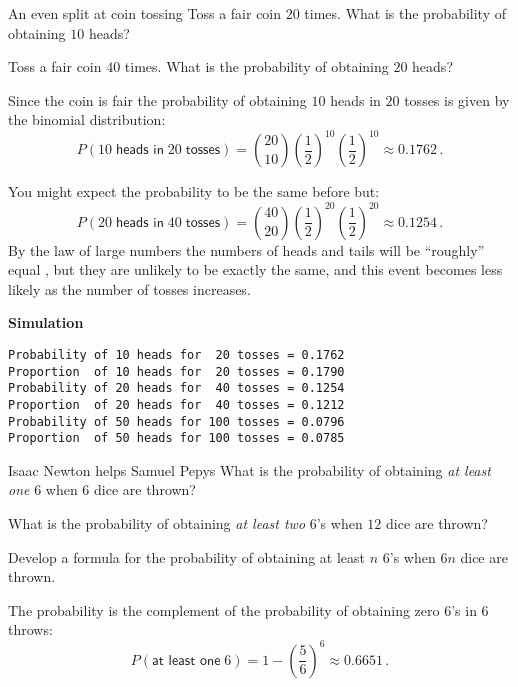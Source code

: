 
\begin{prob}{An even split at coin tossing}
 Toss a fair coin $20$ times. What is the probability of obtaining $10$ heads?

 Toss a fair coin $40$ times. What is the probability of obtaining $20$ heads?
\end{prob}

\solution{}

 Since the coin is fair the probability of obtaining $10$ heads in $20$ tosses is given by the binomial distribution:
\[
P(10\;\textsf{heads in}\; 20\; \textsf{tosses})={20 \choose 10} \left(\frac{1}{2}\right)^{10}\left(\frac{1}{2}\right)^{10} \approx 0.1762\,.
\]

 You might expect the probability to be the same before but:
\[
P(20\;\textsf{heads in}\; 40\; \textsf{tosses})={40 \choose 20} \left(\frac{1}{2}\right)^{20}\left(\frac{1}{2}\right)^{20}\approx 0.1254\,.
\]
By the law of large numbers the numbers of heads and tails will be ``roughly'' equal \cite[Section~8.4]{ross}, but they are unlikely to be exactly the same, and this event becomes less likely as the number of tosses increases.

\textbf{Simulation}
\begin{verbatim}
Probability of 10 heads for  20 tosses = 0.1762
Proportion  of 10 heads for  20 tosses = 0.1790
Probability of 20 heads for  40 tosses = 0.1254
Proportion  of 20 heads for  40 tosses = 0.1212
Probability of 50 heads for 100 tosses = 0.0796
Proportion  of 50 heads for 100 tosses = 0.0785
\end{verbatim}


\begin{prob}{Isaac Newton helps Samuel Pepys}
 What is the probability of obtaining \emph{at least one} $6$ when $6$ dice are thrown?

 What is the probability of obtaining \emph{at least two} $6$'s when $12$ dice are thrown?

 Develop a formula for the probability of obtaining at least $n$ $6$'s when $6n$ dice are thrown.
\end{prob}

\solution{}

 The probability is the complement of the probability of obtaining zero $6$'s in $6$ throws:
\[
P(\textsf{at least one}\; 6)=1-\left(\frac{5}{6}\right)^6\approx 0.6651\,.
\]

